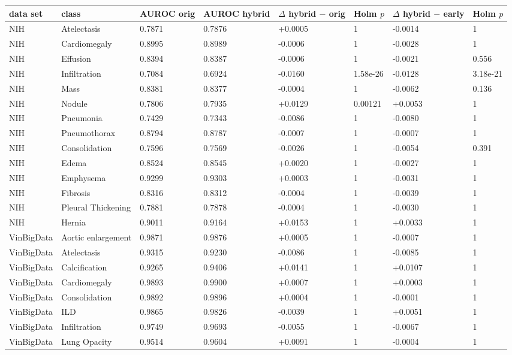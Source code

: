 \begin{tabular}{llllllll}
\toprule
data set & class & AUROC orig & AUROC hybrid & $\Delta$ hybrid $-$ orig & Holm $p$ & $\Delta$ hybrid $-$ early & Holm $p$ \\
\midrule
NIH & Atelectasis & 0.7871 & 0.7876 & +0.0005 & 1 & -0.0014 & 1 \\
NIH & Cardiomegaly & 0.8995 & 0.8989 & -0.0006 & 1 & -0.0028 & 1 \\
NIH & Effusion & 0.8394 & 0.8387 & -0.0006 & 1 & -0.0021 & 0.556 \\
NIH & Infiltration & 0.7084 & 0.6924 & -0.0160 & 1.58e-26 & -0.0128 & 3.18e-21 \\
NIH & Mass & 0.8381 & 0.8377 & -0.0004 & 1 & -0.0062 & 0.136 \\
NIH & Nodule & 0.7806 & 0.7935 & +0.0129 & 0.00121 & +0.0053 & 1 \\
NIH & Pneumonia & 0.7429 & 0.7343 & -0.0086 & 1 & -0.0080 & 1 \\
NIH & Pneumothorax & 0.8794 & 0.8787 & -0.0007 & 1 & -0.0007 & 1 \\
NIH & Consolidation & 0.7596 & 0.7569 & -0.0026 & 1 & -0.0054 & 0.391 \\
NIH & Edema & 0.8524 & 0.8545 & +0.0020 & 1 & -0.0027 & 1 \\
NIH & Emphysema & 0.9299 & 0.9303 & +0.0003 & 1 & -0.0031 & 1 \\
NIH & Fibrosis & 0.8316 & 0.8312 & -0.0004 & 1 & -0.0039 & 1 \\
NIH & Pleural Thickening & 0.7881 & 0.7878 & -0.0004 & 1 & -0.0030 & 1 \\
NIH & Hernia & 0.9011 & 0.9164 & +0.0153 & 1 & +0.0033 & 1 \\
VinBigData & Aortic enlargement & 0.9871 & 0.9876 & +0.0005 & 1 & -0.0007 & 1 \\
VinBigData & Atelectasis & 0.9315 & 0.9230 & -0.0086 & 1 & -0.0085 & 1 \\
VinBigData & Calcification & 0.9265 & 0.9406 & +0.0141 & 1 & +0.0107 & 1 \\
VinBigData & Cardiomegaly & 0.9893 & 0.9900 & +0.0007 & 1 & +0.0003 & 1 \\
VinBigData & Consolidation & 0.9892 & 0.9896 & +0.0004 & 1 & -0.0001 & 1 \\
VinBigData & ILD & 0.9865 & 0.9826 & -0.0039 & 1 & +0.0051 & 1 \\
VinBigData & Infiltration & 0.9749 & 0.9693 & -0.0055 & 1 & -0.0067 & 1 \\
VinBigData & Lung Opacity & 0.9514 & 0.9604 & +0.0091 & 1 & -0.0004 & 1 \\

\end{tabular}
